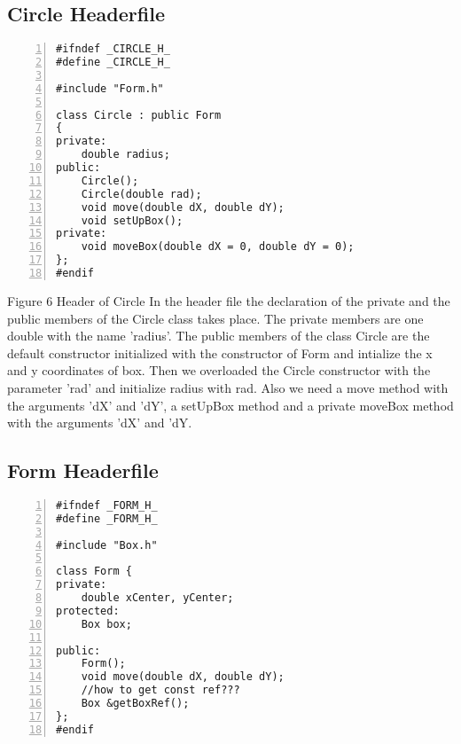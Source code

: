 \documentclass{llncs}
\begin{document}
\subsection{Circle Headerfile}
\begin{lstlisting}[basicstyle=\footnotesize\ttfamily, numbers=left, stepnumber=1, numberstyle = \normalsize]
#ifndef _CIRCLE_H_
#define _CIRCLE_H_

#include "Form.h"

class Circle : public Form
{
private: 
	double radius; 
public:
	Circle();
	Circle(double rad);
	void move(double dX, double dY);
	void setUpBox();
private:
	void moveBox(double dX = 0, double dY = 0);
};
#endif
\end{lstlisting}
\scriptsize{Figure 6 Header of Circle}\newline
\newline
\newline
In the header file the declaration of the private and the public members of the Circle class takes place.\newline
The private members are one double with the name 'radius'.
The public members of the class Circle are the default constructor initialized with the constructor of Form and intialize the x and y coordinates of box.\newline 
Then we overloaded the Circle constructor with the parameter 'rad' and initialize radius with rad.\newline
Also we need a move method with the arguments 'dX' and 'dY', a setUpBox method and a private moveBox method with the arguments 'dX' and 'dY.
\subsection{Form Headerfile}
\begin{lstlisting}[basicstyle=\footnotesize\ttfamily, numbers=left, stepnumber=1, numberstyle = \normalsize]
#ifndef _FORM_H_
#define _FORM_H_

#include "Box.h"

class Form {
private:
	double xCenter, yCenter;  
protected:	
	Box box; 
	
public:
	Form();
	void move(double dX, double dY);
	//how to get const ref???
	Box &getBoxRef();
};
#endif
\end{lstlisting}
\end{document}
